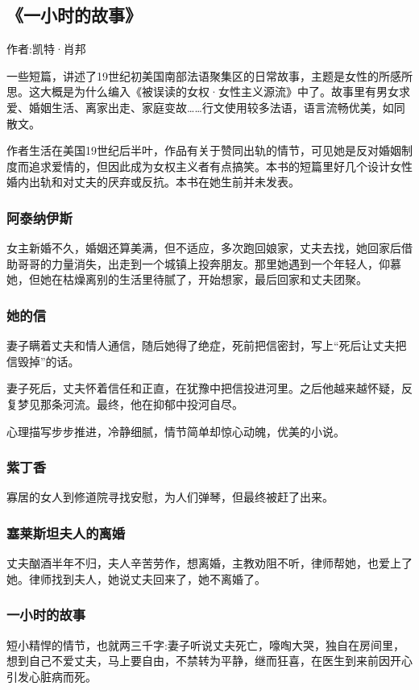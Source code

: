 \subsection{《一小时的故事》}

作者:凯特·肖邦

一些短篇，讲述了19世纪初美国南部法语聚集区的日常故事，主题是女性的所感所思。这大概是为什么编入《被误读的女权·女性主义源流》中了。故事里有男女求爱、婚姻生活、离家出走、家庭变故……行文使用较多法语，语言流畅优美，如同散文。

作者生活在美国19世纪后半叶，作品有关于赞同出轨的情节，可见她是反对婚姻制度而追求爱情的，但因此成为女权主义者有点搞笑。本书的短篇里好几个设计女性婚内出轨和对丈夫的厌弃或反抗。本书在她生前并未发表。

\subsubsection{阿泰纳伊斯}
女主新婚不久，婚姻还算美满，但不适应，多次跑回娘家，丈夫去找，她回家后借助哥哥的力量消失，出走到一个城镇上投奔朋友。那里她遇到一个年轻人，仰慕她，但她在枯燥离别的生活里待腻了，开始想家，最后回家和丈夫团聚。

\subsubsection{她的信}
妻子瞒着丈夫和情人通信，随后她得了绝症，死前把信密封，写上“死后让丈夫把信毁掉”的话。

妻子死后，丈夫怀着信任和正直，在犹豫中把信投进河里。之后他越来越怀疑，反复梦见那条河流。最终，他在抑郁中投河自尽。

心理描写步步推进，冷静细腻，情节简单却惊心动魄，优美的小说。

\subsubsection{紫丁香}
寡居的女人到修道院寻找安慰，为人们弹琴，但最终被赶了出来。

\subsubsection{塞莱斯坦夫人的离婚}
丈夫酗酒半年不归，夫人辛苦劳作，想离婚，主教劝阻不听，律师帮她，也爱上了她。律师找到夫人，她说丈夫回来了，她不离婚了。

\subsubsection{一小时的故事}
短小精悍的情节，也就两三千字:妻子听说丈夫死亡，嚎啕大哭，独自在房间里，想到自己不爱丈夫，马上要自由，不禁转为平静，继而狂喜，在医生到来前因开心引发心脏病而死。